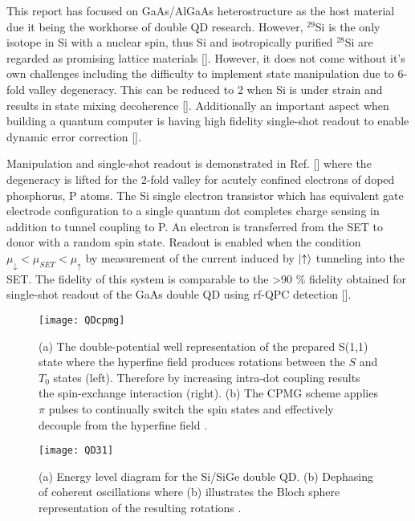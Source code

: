 This report has focused on GaAs/AlGaAs heterostructure as the host material due it being the workhorse of double QD research. However, $^{29}$Si is the only isotope in Si with a nuclear spin, thus Si and isotropically purified $^{28}$Si are regarded as promising lattice materials []. However, it does not come without it's own challenges including the difficulty to implement state manipulation due to 6-fold valley degeneracy. This can be reduced to 2 when Si is under strain and results in state mixing decoherence []. Additionally an important aspect when building a quantum computer is having high fidelity single-shot readout to enable dynamic error correction [].

Manipulation and single-shot readout is demonstrated in Ref. [] where the degeneracy is lifted for the 2-fold valley for acutely confined electrons of doped phosphorus, P atoms. The Si single electron transistor which has equivalent gate electrode configuration to a single quantum dot completes charge sensing in addition to tunnel coupling to P. An electron is transferred from the SET to donor with a random spin state. Readout is enabled when the condition $\mu_{\downarrow}<\mu_{SET}<\mu_{\uparrow}$ by measurement of the current induced by $\lvert\uparrow\rangle$ tunneling into the SET. The fidelity of this system is comparable to the >90 $\%$ fidelity obtained for single-shot readout of the GaAs double QD using rf-QPC detection []. 

\begin{figure}[b]
\centering
\texttt{[image: QDcpmg]}
\caption{\label{fig:QDcpmg} (a) The double-potential well representation of the prepared S(1,1) state where the hyperfine field produces rotations between the $S$ and $T_{0}$ states (left). Therefore by increasing intra-dot coupling results the spin-exchange interaction (right). (b) The CPMG scheme applies $\pi$ pulses to continually switch the spin states and effectively decouple from the hyperfine field \citep{Bluhm2011DephasingS}.}
\end{figure}

\begin{figure}[t]
\centering
\texttt{[image: QD31]}
\caption{\label{fig:QD31}(a) Energy level diagram for the Si/SiGe double QD. (b) Dephasing of coherent oscillations where (b) illustrates the Bloch sphere representation of the resulting rotations \citep{Maune2012CoherentDot}.}
\end{figure}

